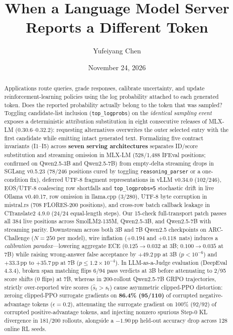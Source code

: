 \documentclass[11pt,letterpaper]{article}
\title{When a Language Model Server Reports a Different Token}
\author{Yufeiyang Chen}
\date{November 24, 2026}
\begin{document}
\maketitle
\begin{abstract}
Applications route queries, grade responses, calibrate uncertainty, and update reinforcement-learning policies using the log probability attached to each generated token. Does the reported probability actually belong to the token that was sampled? Toggling candidate-list inclusion (\texttt{top\_logprobs}) on the \emph{identical sampling event} exposes a deterministic attribution substitution in eight consecutive releases of MLX-LM (0.30.6--0.32.2): requesting alternatives overwrites the outer selected entry with the first candidate while emitting intact generated text. Formalizing five contract invariants (\textsc{I1}--\textsc{I5}) across \textbf{seven serving architectures} separates ID/score substitution and streaming omission in MLX-LM (528/1,488 IFEval positions; confirmed on Qwen2.5-3B and Qwen2.5-7B) from empty-delta streaming drops in SGLang v0.5.23 (78/246 positions cured by toggling \texttt{reasoning\_parser} or a one-condition fix), deferred UTF-8 fragment representations in vLLM v0.34.0 (102/246), EOS/UTF-8 coalescing row shortfalls and \texttt{top\_logprobs=5} stochastic drift in live Ollama v0.40.17, row omission in llama.cpp (3/280), UTF-8 byte corruption in mistral.rs (708 FLORES-200 positions), and cross-row batch callback leakage in CTranslate2 4.9.0 (24/24 equal-length steps). Our 15-check full-transport patch passes all 384 live positions across SmolLM2-135M, Qwen2.5-3B, and Qwen2.5-7B with streaming parity. Downstream across both 3B and 7B Qwen2.5 checkpoints on ARC-Challenge ($N=250$ per model), wire inflation ($+0.194$ and $+0.118$~nats) induces a \emph{calibration paradox}---lowering aggregate ECE ($0.125 \to 0.032$ at 3B; $0.100 \to 0.035$ at 7B) while raising wrong-answer false acceptance by $+49.2$\,pp at 3B ($p<10^{-6}$) and $+33.3$\,pp to $+35.7$\,pp at 7B ($p\le 1.2\times 10^{-4}$). In LLM-as-a-Judge evaluation (DeepEval 4.3.4), broken span matching flips 6/94 pass verdicts at 3B before attenuating to 2/95 score shifts (0 flips) at 7B, whereas in 200-rollout Qwen2.5-7B GRPO trajectories, strictly over-reported wire scores ($\hat{s}_t > s_t$) cause asymmetric clipped-PPO distortion: zeroing clipped-PPO surrogate gradients on \textbf{86.4\% (95/110)} of corrupted negative-advantage tokens ($\epsilon=0.2$), attenuating the surrogate gradient on 100\% (92/92) of corrupted positive-advantage tokens, and injecting nonzero spurious Step-0 KL divergence in 181/200 rollouts, alongside a $-1.90$\,pp held-out accuracy drop across 128 online RL seeds.
\end{abstract}
\end{document}
